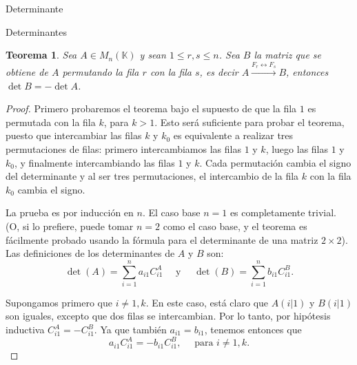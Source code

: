\documentclass[a4paper,12pt,twoside,spanish]{amsbook}
\newtheorem{teorema}{Teorema}[section]
\theoremstyle{definition}
\theoremstyle{remark}
\newcommand{\K}{\mathbb K}
\begin{document}
\begin{chapter}{Determinante}
\begin{section}{Determinantes}
		
		
		\begin{teorema} \label{det-prop-perm-filas}
			Sea $A  \in M_n(\K)$ y sean $1 \le r,s \le n$.
			Sea $B$ la matriz que se obtiene de $A$ permutando la fila $r$ con la fila $s$, es decir  $A  \stackrel{F_r \leftrightarrow F_s}{\longrightarrow} B$, entonces $\det B = -\det A$.
		\end{teorema}
		\begin{proof}
			Primero probaremos el teorema bajo el supuesto de que la fila $1$ es permutada con la fila $k$, para $k > 1$. Esto será suficiente para probar el teorema, puesto que intercambiar las filas $k$ y $k_ 0$ es equivalente a realizar tres permutaciones de filas: primero intercambiamos las filas $1$ y $k$, luego las filas $1$ y $k_{0}$, y finalmente intercambiando las filas $1$ y $k$. Cada permutación cambia el signo del determinante y al ser tres permutaciones,  el intercambio de la fila $k$ con la fila $k_0$ cambia el signo.
			
			
			La prueba es por inducción en $n$. El caso base $n = 1$ es completamente trivial.
			(O, si lo prefiere, puede tomar $n = 2$ como el caso base, y el teorema es
			fácilmente probado usando la fórmula para el determinante de una matriz $2 \times 2$).
			Las definiciones de los determinantes de $A$ y $B$ son:
			\begin{equation*}
			\det(A) = \sum_{i=1}^{n}  a_{i1}C^A_{i1} \quad \text{ y } \quad \det(B) = \sum_{i=1}^{n}  b_{i1}C^B_{i1}.
			\end{equation*}
			
			
			Supongamos primero que $i \ne 1, k$. En este caso, está claro que $A(i|1)$ y $B(i|1)$ son iguales, excepto que dos filas se intercambian. Por lo tanto, por hipótesis inductiva $C^A_{i1} = -C^B_{i1}$. Ya que también $a_{i1} = b_{i1}$, tenemos entonces que
			\begin{equation}\label{det-perm-01}
			a_{i1}C^A_{i1} = - b_{i1}C^B_{i1}, \quad \text{ para } i\ne 1,k.
			\end{equation}
			

\end{proof}
\end{section}
\end{chapter}
\end{document}
